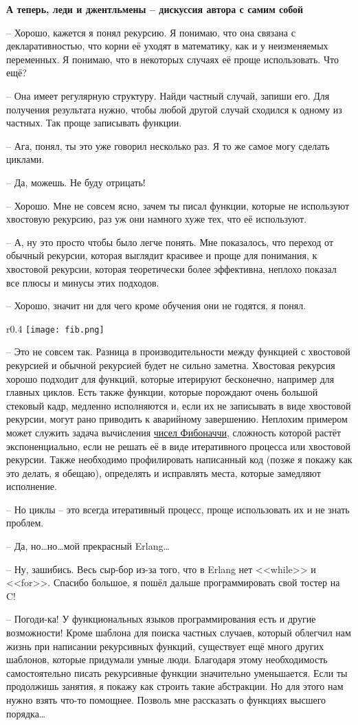\textbf{А теперь, леди и джентльмены \--- дискуссия автора с самим собой}

\--- Хорошо, кажется я понял рекурсию.
Я понимаю, что она связана с декларативностью, что корни её уходят в математику, как и у неизменяемых переменных. Я понимаю, что в некоторых случаях её проще использовать. Что ещё?

\--- Она имеет регулярную структуру.
Найди частный случай, запиши его.
Для получения результата нужно, чтобы любой другой случай сходился к одному из частных.
Так проще записывать функции.

\--- Ага, понял, ты это уже говорил несколько раз.
Я то же самое могу сделать циклами.

\--- Да, можешь.
Не буду отрицать!

\--- Хорошо.
Мне не совсем ясно, зачем ты писал функции, которые не используют хвостовую рекурсию, раз уж они намного хуже тех, что её используют.

\--- А, ну это просто чтобы было легче понять.
Мне показалось, что переход от обычный рекурсии, которая выглядит красивее и проще для понимания, к хвостовой рекурсии, которая теоретически более эффективна, неплохо показал все плюсы и минусы этих подходов.

\--- Хорошо, значит ни для чего кроме обучения они не годятся, я понял.
\begin{wrapfigure}{r}{0.4\linewidth}
    \texttt{[image: fib.png]}
\end{wrapfigure}

\--- Это не совсем так.
Разница в производительности между функцией с хвостовой рекурсией и обычной рекурсией будет не сильно заметна.
Хвостовая рекурсия хорошо подходит для функций, которые итерируют бесконечно, например для главных циклов.
Есть также функции, которые порождают очень большой стековый кадр, медленно исполняются и, если их не записывать в виде хвостовой рекурсии, могут рано приводить к аварийному завершению.
Неплохим примером может служить задача вычисления \href{http://en.wikipedia.org/wiki/Fibonacci\_number}{чисел Фибоначчи}, сложность которой растёт экспоненциально, если не решать её в виде итеративного процесса или хвостовой рекурсии.
Также необходимо профилировать написанный код (позже я покажу как это делать, я обещаю), определять и исправлять места, которые замедляют исполнение.

\--- Но циклы \--- это всегда итеративный процесс, проще использовать их и не знать проблем.

\--- Да, но\ldots но\ldots мой прекрасный Erlang\ldots

\--- Ну, зашибись.
Весь сыр\--бор из\--за того, что в Erlang нет <<while>> и <<for>>.
Спасибо большое, я пошёл дальше программировать свой тостер на C!

\--- Погоди\--ка!
У функциональных языков программирования есть и другие возможности!
Кроме шаблона для поиска частных случаев, который облегчил нам жизнь при написании рекурсивных функций, существует ещё много других шаблонов, которые придумали умные люди.
Благодаря этому необходимость самостоятельно писать рекурсивные функции значительно уменьшается.
Если ты продолжишь занятия, я покажу как строить такие абстракции.
Но для этого нам нужно взять что\--то помощнее.
Позволь мне рассказать о функциях высшего порядка\ldots
